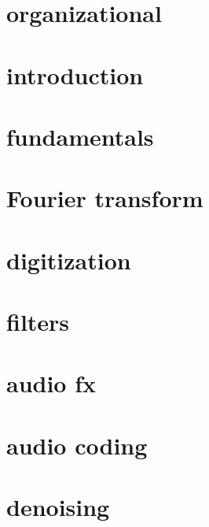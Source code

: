 \documentclass[compress,hyperref={pdfpagelabels=false}]{beamer}
\begin{document}
	

	\section[org]{organizational}
				

	\section[intro]{introduction}
        
        
        
        
    \section[basics]{fundamentals}
        
        
        
        
        
        
    \section[FT]{Fourier transform}
        
        
        
    \section[discretization]{digitization}
        
        
        
        
        
        
        
        
        
    \section{filters}
        

    \section[fx]{audio fx}
        
        
        
        
        
        
        
        
    \section[coding]{audio coding}
        
        
        
        
        
    \section{denoising}
        
\end{document}
